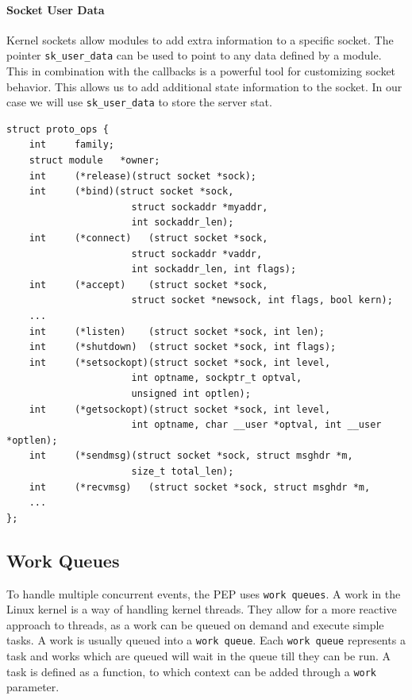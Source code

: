 \documentclass[a4paper,english, 11pt]{report}
\begin{document}
\paragraph{Socket User Data}
Kernel sockets allow modules to add extra information to a specific socket. The pointer \verb|sk_user_data| can be used to point to any data defined by a module. This in combination with the callbacks is a powerful tool for customizing socket behavior. This allows us to add additional state information to the socket. In our case we will use \verb|sk_user_data| to store the server stat.\\

\noindent\begin{minipage}{\linewidth}
\begin{verbatim}
struct proto_ops {
    int		family;
    struct module	*owner;
    int		(*release)(struct socket *sock);
    int		(*bind)(struct socket *sock,
    			      struct sockaddr *myaddr,
    			      int sockaddr_len);
    int		(*connect)   (struct socket *sock,
    			      struct sockaddr *vaddr,
    			      int sockaddr_len, int flags);
    int		(*accept)    (struct socket *sock,
    			      struct socket *newsock, int flags, bool kern);
    ...
    int		(*listen)    (struct socket *sock, int len);
    int		(*shutdown)  (struct socket *sock, int flags);
    int		(*setsockopt)(struct socket *sock, int level,
    			      int optname, sockptr_t optval,
    			      unsigned int optlen);
    int		(*getsockopt)(struct socket *sock, int level,
    			      int optname, char __user *optval, int __user *optlen);
    int		(*sendmsg)(struct socket *sock, struct msghdr *m,
    			      size_t total_len);
    int		(*recvmsg)   (struct socket *sock, struct msghdr *m,
    ...
};
\end{verbatim}
\label{fig:proto_ops}
\end{minipage}

\subsection{Work Queues}
To handle multiple concurrent events, the PEP uses \verb|work queues|. A work in the Linux kernel is a way of handling kernel threads. They allow for a more reactive approach to threads, as a work can be queued on demand and execute simple tasks. A work is usually queued into a \verb|work queue|. Each \verb|work queue| represents a task and works which are queued will wait in the queue till they can be run. A task is defined as a function, to which context can be added through a \verb|work| parameter.\\
\end{document}
